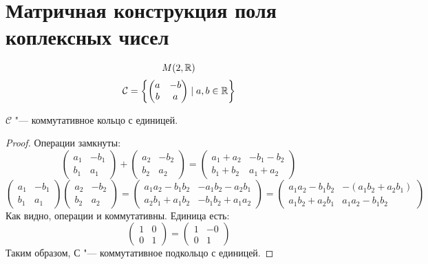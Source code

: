 \section{Матричная конструкция поля коплексных чисел}

$$M(2, \mathbb{R})$$
$$\mathcal{C} = \left\{\left(\begin{matrix}a & -b \\ b & a\end{matrix}\right) \mid a, b \in \mathbb{R}\right\}$$

\begin{assertion}
$\mathcal{C}$ "--- коммутативное кольцо с единицей.
\end{assertion}
\begin{proof}
Операции замкнуты:
$$\left(\begin{matrix}a_1 & -b_1 \\ b_1 & a_1\end{matrix}\right) + \left(\begin{matrix}a_2 & -b_2 \\ b_2 & a_2\end{matrix}\right) = \left(\begin{matrix}a_1+a_2 & -b_1-b_2 \\ b_1+b_2 & a_1+a_2\end{matrix}\right)$$
$$\left(\begin{matrix}a_1 & -b_1 \\ b_1 & a_1\end{matrix}\right) \left(\begin{matrix}a_2 & -b_2 \\ b_2 & a_2\end{matrix}\right) = \left(\begin{matrix}a_1a_2-b_1b_2 & -a_1b_2-a_2b_1 \\ a_2b_1+a_1b_2 & -b_1b_2+a_1a_2\end{matrix}\right) = \left(\begin{matrix}a_1a_2-b_1b_2 & -(a_1b_2+a_2b_1) \\ a_1b_2+a_2b_1 & a_1a_2-b_1b_2\end{matrix}\right)$$
Как видно, операции и коммутативны.
Единица есть:
$$\left(\begin{matrix}1 & 0 \\ 0 & 1\end{matrix}\right) = \left(\begin{matrix}1 & -0 \\ 0 & 1\end{matrix}\right)$$
Таким образом, $\mathcal{С}$ "--- коммутативное подкольцо с единицей.
\end{proof}

